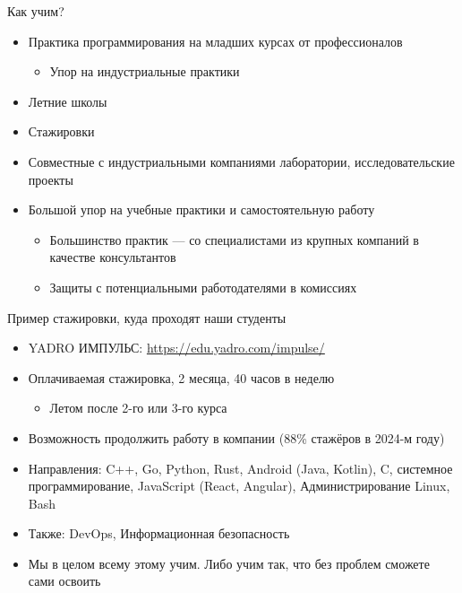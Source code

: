 \documentclass{slides-style}
\begin{document}
    \begin{frame}{Как учим?}
        \begin{itemize}
            \item Практика программирования на младших курсах от профессионалов
            \begin{itemize}
                \item Упор на индустриальные практики
            \end{itemize}
            \item Летние школы
            \item Стажировки
            \item Совместные с индустриальными компаниями лаборатории, исследовательские проекты
            \item Большой упор на учебные практики и самостоятельную работу
            \begin{itemize}
                \item Большинство практик --- со специалистами из крупных компаний в качестве консультантов
                \item Защиты с потенциальными работодателями в комиссиях
            \end{itemize}
        \end{itemize}
    \end{frame}

    \begin{frame}{Пример стажировки, куда проходят наши студенты}
        \begin{itemize}
            \item YADRO ИМПУЛЬС: \url{https://edu.yadro.com/impulse/}
            \item Оплачиваемая стажировка, 2 месяца, 40 часов в неделю
            \begin{itemize}
                \item Летом после 2-го или 3-го курса
            \end{itemize}
            \item Возможность продолжить работу в компании (88\% стажёров в 2024-м году)
            \item Направления: C++, Go, Python, Rust, Android (Java, Kotlin), C, системное программирование, JavaScript (React, Angular), Администрирование Linux, Bash
            \item Также: DevOps, Информационная безопасность
            \item Мы в целом всему этому учим. Либо учим так, что без проблем сможете сами освоить
        \end{itemize}
    \end{frame}
\end{document}
